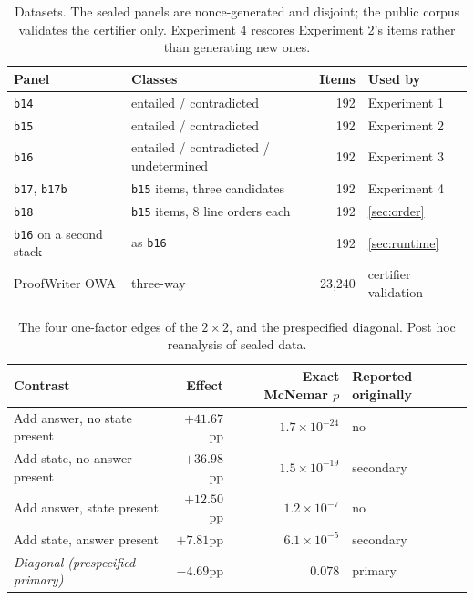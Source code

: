 \documentclass[10pt,twocolumn]{article}
\begin{document}
\begin{table}[tb]
\centering\small
\caption{Datasets. The sealed panels are nonce-generated and disjoint; the
public corpus validates the certifier only. Experiment 4 rescores Experiment 2's
items rather than generating new ones.}
\label{tab:panels}
\begin{tabular}{llrl}
\toprule
Panel & Classes & Items & Used by \\
\midrule
\texttt{b14} & entailed / contradicted & 192 & Experiment 1 \\
\texttt{b15} & entailed / contradicted & 192 & Experiment 2 \\
\texttt{b16} & entailed / contradicted / undetermined & 192 & Experiment 3 \\
\texttt{b17}, \texttt{b17b} & \texttt{b15} items, three candidates & 192 & Experiment 4 \\
\texttt{b18} & \texttt{b15} items, 8 line orders each & 192 & \cref{sec:order} \\
\texttt{b16} on a second stack & as \texttt{b16} & 192 & \cref{sec:runtime} \\
ProofWriter OWA \citep{tafjord2020proofwriter} & three-way & 23{,}240 & certifier validation \\
\bottomrule
\end{tabular}
\end{table}

\begin{table}[tb]
\centering\small
\caption{The four one-factor edges of the $2\times2$, and the prespecified
diagonal. Post hoc reanalysis of sealed data.}
\label{tab:edges}
\begin{tabular}{lrrl}
\toprule
Contrast & Effect & Exact McNemar $p$ & Reported originally \\
\midrule
Add answer, no state present   & $+41.67$pp & $1.7\times10^{-24}$ & no \\
Add state, no answer present   & $+36.98$pp & $1.5\times10^{-19}$ & secondary \\
Add answer, state present      & $+12.50$pp & $1.2\times10^{-7}$  & no \\
Add state, answer present      & $+7.81$pp  & $6.1\times10^{-5}$  & secondary \\
\midrule
\emph{Diagonal (prespecified primary)} & $-4.69$pp & $0.078$ & primary \\
\bottomrule
\end{tabular}
\end{table}
\end{document}
